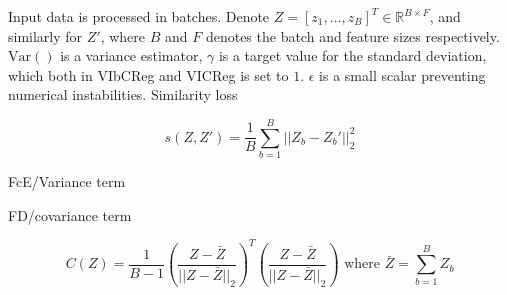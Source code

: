 \documentclass[../../thesis.tex]{subfiles}
\begin{document}
Input data is processed in batches. Denote $Z = [z_1,...,z_B]^T \in \mathbb{R}^{B\times F}$, and similarly for $Z'$, where $B$ and $F$ denotes the batch and feature sizes respectively. $\text{Var}()$ is a variance estimator, $\gamma$ is a target value for the standard deviation, which both in VIbCReg and VICReg is set to $1$. $\epsilon$ is a small scalar preventing numerical instabilities.\newline 
Similarity loss

\begin{equation}
    s(Z,Z') = \frac{1}{B} \sum_{b=1}^B || Z_b-Z_b'||_2^2
\end{equation}

FcE/Variance term



FD/covariance term

\begin{equation}
    C(Z) = \frac{1}{B-1} \left(\frac{Z-\bar{Z}}{||Z-\bar{Z}||_2}\right)^T\left(\frac{Z-\bar{Z}}{||Z-\bar{Z}||_2}\right) \text{ where }  \bar{Z} = \sum_{b=1}^B  Z_b
\end{equation}

\end{document}
